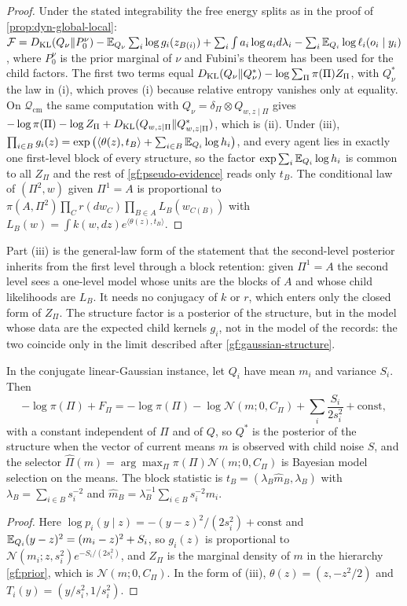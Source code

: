 \begin{proof}
Under the stated integrability the free energy splits as in the proof of
\cref{prop:dyn-global-local}:
$\mathcal F=D_{\mathrm{KL}}(Q_\nu\Vert P_0^\nu)-\mathbb E_{Q_\nu}\sum_i\log g_i(z_{B(i)})
+\sum_i\int a_i\log a_id\lambda_i-\sum_i\mathbb E_{Q_i}\log\ell_i(o_i\mid y_i)$, where
$P_0^\nu$ is the prior marginal of $\nu$ and Fubini's theorem has been used
for the child factors. The first two terms equal
$D_{\mathrm{KL}}(Q_\nu\Vert Q_\nu^*)-\log\sum_\Pi\pi(\Pi)Z_\Pi$, with $Q_\nu^*$ the law in
(i), which proves (i) because relative entropy vanishes only at equality.
On $\mathcal Q_{\mathrm{cm}}$ the same computation with $Q_\nu=\delta_\Pi\otimes
Q_{w,z\mid\Pi}$ gives $-\log\pi(\Pi)-\log Z_\Pi+D_{\mathrm{KL}}(Q_{w,z\mid\Pi}\Vert
Q^*_{w,z\mid\Pi})$, which is (ii). Under (iii),
$\prod_{i\in B}g_i(z)=\exp\big(\langle\theta(z),t_B\rangle+\sum_{i\in B}
\mathbb E_{Q_i}\log h_i\big)$, and every agent lies in exactly one first-level block
of every structure, so the factor $\exp\sum_i\mathbb E_{Q_i}\log h_i$ is common to
all $Z_\Pi$ and the rest of \cref{gf:pseudo-evidence} reads only $t_B$. The
conditional law of $(\Pi^2,w)$ given $\Pi^1=A$ is proportional to
$\pi(A,\Pi^2)\prod_Cr(dw_C)\prod_{B\in A}L_B(w_{C(B)})$ with
$L_B(w)=\int k(w,dz)e^{\langle\theta(z),t_B\rangle}$.
\end{proof}

Part (iii) is the general-law form of the statement that the second-level
posterior inherits from the first level through a block retention: given
$\Pi^1=A$ the second level sees a one-level model whose units are the blocks
of $A$ and whose child likelihoods are $L_B$. It needs no conjugacy of $k$
or $r$, which enters only the closed form of $Z_\Pi$. The structure factor is
a posterior of the structure, but in the model whose data are the expected
child kernels $g_i$, not in the model of the records: the two coincide only
in the limit described after \cref{gf:gaussian-structure}.

In the conjugate linear-Gaussian instance, let $Q_i$ have mean $m_i$ and
variance $S_i$. Then
\begin{equation}
 -\log\pi(\Pi)+F_\Pi
 =-\log\pi(\Pi)-\log\mathcal N(m;0,C_\Pi)+\sum_i\frac{S_i}{2s_i^2}
 +\mathrm{const},
 \label{gf:gaussian-score}
\end{equation}
with a constant independent of $\Pi$ and of $Q$, so $Q^*$ is the posterior of
the structure when the vector of current means $m$ is observed with child
noise $S$, and the selector
$\hat\Pi(m)=\arg\max_\Pi\pi(\Pi)\mathcal N(m;0,C_\Pi)$ is Bayesian model
selection on the means. The block statistic is
$t_B=(\lambda_B\hat m_B,\lambda_B)$ with
$\lambda_B=\sum_{i\in B}s_i^{-2}$ and
$\hat m_B=\lambda_B^{-1}\sum_{i\in B}s_i^{-2}m_i$.
\begin{proof}
Here $\log p_i(y\mid z)=-(y-z)^2/(2s_i^2)+\mathrm{const}$ and
$\mathbb E_{Q_i}(y-z)^2=(m_i-z)^2+S_i$, so $g_i(z)$ is proportional to
$\mathcal N(m_i;z,s_i^2)e^{-S_i/(2s_i^2)}$, and $Z_\Pi$ is the marginal
density of $m$ in the hierarchy \cref{gf:prior}, which is
$\mathcal N(m;0,C_\Pi)$. In the form of (iii), $\theta(z)=(z,-z^2/2)$ and
$T_i(y)=(y/s_i^2,1/s_i^2)$.
\end{proof}

